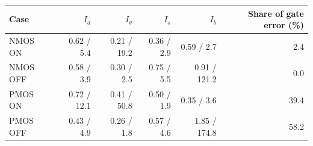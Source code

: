 \begin{tabular}{lrrrrr}
\hline
Case & $I_d$ & $I_g$ & $I_s$ & $I_b$ & Share of gate error (\%) \\
\hline
NMOS ON & 0.62 / 5.4 & 0.21 / 19.2 & 0.36 / 2.9 & 0.59 / 2.7 & 2.4 \\
NMOS OFF & 0.58 / 3.9 & 0.30 / 2.5 & 0.75 / 5.5 & 0.91 / 121.2 & 0.0 \\
PMOS ON & 0.72 / 12.1 & 0.41 / 50.8 & 0.50 / 1.9 & 0.35 / 3.6 & 39.4 \\
PMOS OFF & 0.43 / 4.9 & 0.26 / 1.8 & 0.57 / 4.6 & 1.85 / 174.8 & 58.2 \\
\hline
\end{tabular}
